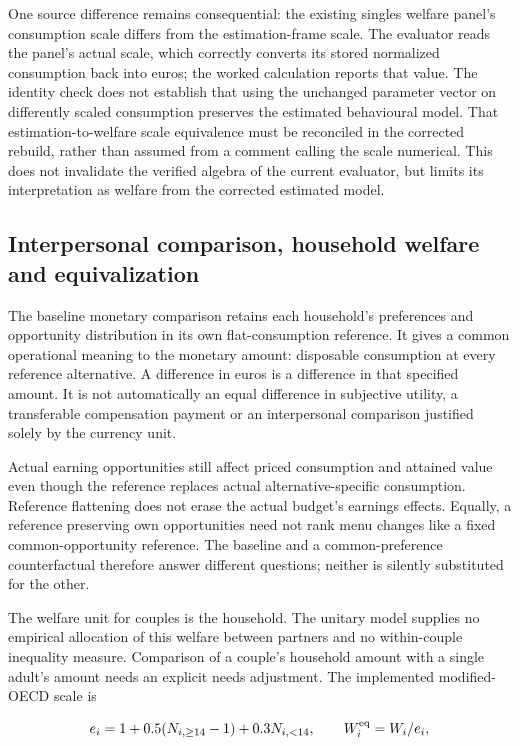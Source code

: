 \documentclass[11pt,a4paper]{article}
\begin{document}
One source difference remains consequential: the existing singles welfare panel's consumption scale differs from the estimation-frame scale. The evaluator reads the panel's actual scale, which correctly converts its stored normalized consumption back into euros; the worked calculation reports that value. The identity check does not establish that using the unchanged parameter vector on differently scaled consumption preserves the estimated behavioural model. That estimation-to-welfare scale equivalence must be reconciled in the corrected rebuild, rather than assumed from a comment calling the scale numerical. This does not invalidate the verified algebra of the current evaluator, but limits its interpretation as welfare from the corrected estimated model.

\subsection{Interpersonal comparison, household welfare and equivalization}\label{interpersonal-comparison-household-welfare-and-equivalization}

The baseline monetary comparison retains each household's preferences and opportunity distribution in its own flat-consumption reference. It gives a common operational meaning to the monetary amount: disposable consumption at every reference alternative. A difference in euros is a difference in that specified amount. It is not automatically an equal difference in subjective utility, a transferable compensation payment or an interpersonal comparison justified solely by the currency unit.

Actual earning opportunities still affect priced consumption and attained value even though the reference replaces actual alternative-specific consumption. Reference flattening does not erase the actual budget's earnings effects. Equally, a reference preserving own opportunities need not rank menu changes like a fixed common-opportunity reference. The baseline and a common-preference counterfactual therefore answer different questions; neither is silently substituted for the other.

The welfare unit for couples is the household. The unitary model supplies no empirical allocation of this welfare between partners and no within-couple inequality measure. Comparison of a couple's household amount with a single adult's amount needs an explicit needs adjustment. The implemented modified-OECD scale is

\[e_i=1+0.5(N_{i,\ge14}-1)+0.3N_{i,<14},\qquad W_i^{\rm eq}=W_i/e_i,\]
\end{document}
